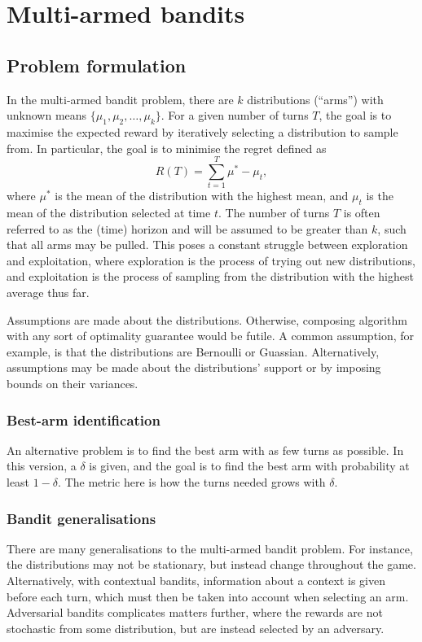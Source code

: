 \chapter{Multi-armed bandits}
\label{chap:bandits}

\section{Problem formulation}
In the multi-armed bandit problem, there are $k$ distributions (\enquote{arms})  with unknown means $\{\mu_1, \mu_2,\dots,\mu_k\}$.
For a given number of turns $T$, the goal is to maximise the expected reward by iteratively selecting a distribution to sample from.
In particular, the goal is to minimise the regret defined as
\begin{equation}
    R(T) = \sum_{t=1}^T \mu^* - \mu_t,
\end{equation}
where $\mu^*$ is the mean of the distribution with the highest mean, and $\mu_t$ is the mean of the distribution selected at time $t$.
The number of turns $T$ is often referred to as the (time) horizon and will be assumed to be greater than $k$, such that all arms may be pulled.
This poses a constant struggle between exploration and exploitation, where exploration is the process of trying out new distributions, and exploitation is the process of sampling from the distribution with the highest average thus far.

Assumptions are made about the distributions.
Otherwise, composing algorithm with any sort of optimality guarantee would be futile.
A common assumption, for example, is that the distributions are Bernoulli or Guassian.
Alternatively, assumptions may be made about the distributions' support or by imposing bounds on their variances.

\subsection{Best-arm identification}
An alternative problem is to find the best arm with as few turns as possible.
In this version, a $\delta$ is given, and the goal is to find the best arm with probability at least $1-\delta$.
The metric here is how the turns needed grows with $\delta$.

\subsection{Bandit generalisations}
There are many generalisations to the multi-armed bandit problem.
For instance, the distributions may not be stationary, but instead change throughout the game.
Alternatively, with contextual bandits, information about a context is given before each turn, which must then be taken into account when selecting an arm.
Adversarial bandits complicates matters further, where the rewards are not stochastic from some distribution, but are instead selected by an adversary.



